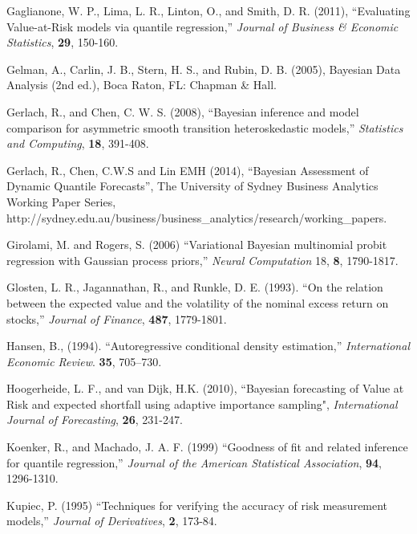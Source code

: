 \documentclass[12pt,epsf]{article}
\begin{document}
\begin{description}
\item Gaglianone, W. P., Lima, L. R., Linton, O., and Smith, D. R. (2011), ``Evaluating Value-at-Risk models via quantile regression,''
    {\em Journal of Business \& Economic Statistics}, {\bf 29}, 150-160.

\item
Gelman, A., Carlin, J. B., Stern, H. S., and Rubin, D. B. (2005), Bayesian Data Analysis (2nd ed.), Boca Raton, FL: Chapman \& Hall.

\item Gerlach, R., and Chen, C. W. S. (2008), ``Bayesian inference and model comparison for asymmetric smooth transition
   heteroskedastic models,'' {\em Statistics and Computing}, {\bf 18}, 391-408.

\item  Gerlach, R., Chen, C.W.S and Lin EMH (2014), ``Bayesian Assessment of Dynamic Quantile Forecasts'', The University of
    Sydney Business Analytics Working Paper Series, http://sydney.edu.au/business/business_analytics/research/working_papers.

\item
Girolami, M. and Rogers, S. (2006) ``Variational Bayesian multinomial probit regression with Gaussian process priors,''
{\em Neural Computation} 18, {\bf 8}, 1790-1817.

\item Glosten, L. R., Jagannathan, R., and Runkle, D. E. (1993). ``On the relation between the expected value and the volatility
of the nominal excess return on stocks,'' {\em Journal of Finance}, {\bf 487}, 1779-1801.

\item Hansen, B., (1994). ``Autoregressive conditional density estimation,'' {\em International Economic Review}. {\bf 35}, 705–730.

\item Hoogerheide, L. F., and van Dijk, H.K. (2010), ``Bayesian forecasting of Value at Risk and expected shortfall using
adaptive importance sampling", {\em International Journal of Forecasting}, {\bf 26}, 231-247.

\item
Koenker, R., and Machado, J. A. F. (1999) ``Goodness of fit and related inference for quantile regression,'' {\em Journal of the American
Statistical Association}, {\bf 94}, 1296-1310.

\item
Kupiec, P. (1995) ``Techniques for verifying the accuracy of risk measurement models,'' {\em Journal of Derivatives},
{\bf 2}, 173-84.


\end{description}
\end{document}
